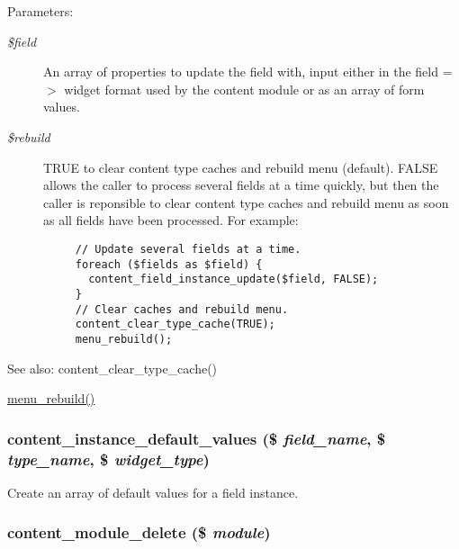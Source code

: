 \begin{Desc}
\item[Parameters:]
\begin{description}
\item[{\em \$field}]An array of properties to update the field with, input either in the field =$>$ widget format used by the content module or as an array of form values. \item[{\em \$rebuild}]TRUE to clear content type caches and rebuild menu (default). FALSE allows the caller to process several fields at a time quickly, but then the caller is reponsible to clear content type caches and rebuild menu as soon as all fields have been processed. For example: 

\begin{Code}\begin{verbatim}     // Update several fields at a time.
     foreach ($fields as $field) {
       content_field_instance_update($field, FALSE);
     }
     // Clear caches and rebuild menu.
     content_clear_type_cache(TRUE);
     menu_rebuild();
\end{verbatim}
\end{Code}

 \end{description}
\end{Desc}
\begin{Desc}
\item[See also:]content\_\-clear\_\-type\_\-cache() 

\hyperlink{group__menu_gf36dcb9d5491ef5e7d2cf22c1f5c69f4}{menu\_\-rebuild()} \end{Desc}
\hypertarget{content_8crud_8inc_8df5e758ddedb3686215f05da5009b52}{
\subsubsection[{content\_\-instance\_\-default\_\-values}]{\setlength{\rightskip}{0pt plus 5cm}content\_\-instance\_\-default\_\-values (\$ {\em field\_\-name}, \/  \$ {\em type\_\-name}, \/  \$ {\em widget\_\-type})}}
\label{content_8crud_8inc_8df5e758ddedb3686215f05da5009b52}


Create an array of default values for a field instance. \hypertarget{content_8crud_8inc_1edd225d1bdea17dc4348de821f11aca}{
\subsubsection[{content\_\-module\_\-delete}]{\setlength{\rightskip}{0pt plus 5cm}content\_\-module\_\-delete (\$ {\em module})}}
\label{content_8crud_8inc_1edd225d1bdea17dc4348de821f11aca}



